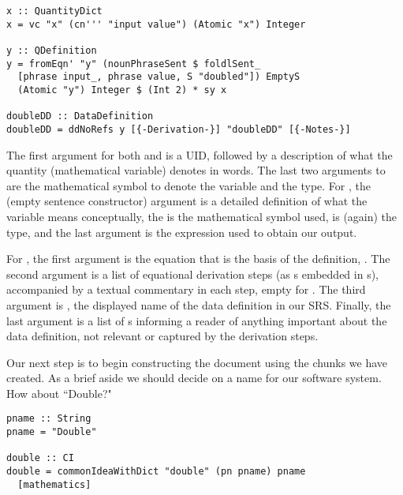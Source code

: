 \begin{tcolorbox}[breakable, toprule at break=0pt, bottomrule at break=0pt]
\begin{verbatim}
x :: QuantityDict
x = vc "x" (cn''' "input value") (Atomic "x") Integer

y :: QDefinition
y = fromEqn' "y" (nounPhraseSent $ foldlSent_
  [phrase input_, phrase value, S "doubled"]) EmptyS
  (Atomic "y") Integer $ (Int 2) * sy x

doubleDD :: DataDefinition
doubleDD = ddNoRefs y [{-Derivation-}] "doubleDD" [{-Notes-}]
\end{verbatim}
\end{tcolorbox}

The first argument for both  and  is a UID, followed by a description of what the quantity (mathematical variable) denotes in words. The last two arguments to  are the mathematical symbol to denote the variable and the type. For , the  (empty sentence constructor) argument is a detailed definition of what the variable means conceptually, the  is the mathematical symbol used,  is (again) the type, and the last argument is the expression used to obtain our output.

For , the first argument is the equation that is the basis of the definition, . The second argument is a list of equational derivation steps (as s embedded in s), accompanied by a textual commentary in each step, empty for . The third argument is , the displayed name of the data definition in our SRS. Finally, the last argument is a list of s informing a reader of anything important about the data definition, not relevant or captured by the derivation steps.

Our next step is to begin constructing the document using the chunks we have created. As a brief aside we should decide on a name for our software system. How about ``Double?"

\begin{tcolorbox}
\begin{verbatim}
pname :: String
pname = "Double"

double :: CI
double = commonIdeaWithDict "double" (pn pname) pname
  [mathematics]
\end{verbatim}
\end{tcolorbox}

